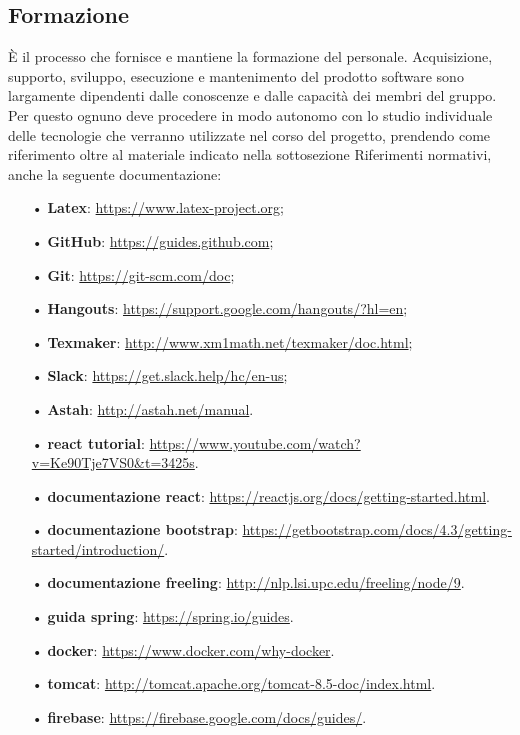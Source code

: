 \subsection{Formazione}
È il processo che fornisce e mantiene la formazione del personale. Acquisizione, supporto, sviluppo, esecuzione e mantenimento 
del prodotto software sono largamente dipendenti dalle conoscenze e dalle capacità dei membri del gruppo. 
\newline
Per questo ognuno deve procedere in modo autonomo con lo studio individuale delle tecnologie che verranno utilizzate nel corso del progetto, prendendo come riferimento oltre al materiale indicato nella sottosezione Riferimenti normativi, anche la seguente documentazione:
\begin{itemize}
\item[•] \textbf{Latex}: \url{https://www.latex-project.org};
\item[•] \textbf{GitHub}: \url{https://guides.github.com};
\item[•] \textbf{Git}: \url{https://git-scm.com/doc};
\item[•] \textbf{Hangouts}: \url{https://support.google.com/hangouts/?hl=en};
\item[•] \textbf{Texmaker}: \url{http://www.xm1math.net/texmaker/doc.html};
\item[•] \textbf{Slack}: \url{https://get.slack.help/hc/en-us};
\item[•] \textbf{Astah}: \url{http://astah.net/manual}.
\item[•] \textbf{react tutorial}: \url{https://www.youtube.com/watch?v=Ke90Tje7VS0&t=3425s}.
\item[•] \textbf{documentazione react}: \url{https://reactjs.org/docs/getting-started.html}.
\item[•] \textbf{documentazione bootstrap}: \url{https://getbootstrap.com/docs/4.3/getting-started/introduction/}.
\item[•] \textbf{documentazione freeling}: \url{http://nlp.lsi.upc.edu/freeling/node/9}.
\item[•] \textbf{guida spring}: \url{https://spring.io/guides}.
\item[•] \textbf{docker}: \url{https://www.docker.com/why-docker}.
\item[•] \textbf{tomcat}: \url{http://tomcat.apache.org/tomcat-8.5-doc/index.html}.
\item[•] \textbf{firebase}: \url{https://firebase.google.com/docs/guides/}.
\end{itemize}